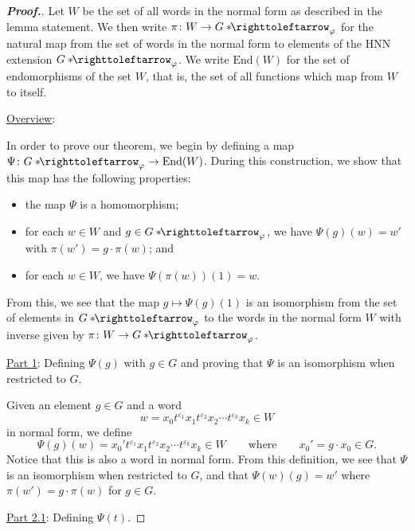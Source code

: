 \documentclass[11pt,a4paper,reqno]{amsart}
\theoremstyle{plain}
\theoremstyle{definition}
\theoremstyle{definition}
\newenvironment{myproof}{\begin{proof}[\normalfont\bfseries Proof.]}{\end{proof}}
\newcommand\hnn{*\!\!\righttoleftarrow}
\begin{document}
\begin{myproof}
	Let $W$ be the set of all words in the normal form as described in the lemma statement.
	We then write $\pi\colon W\to G\hnn_\varphi$ for the natural map from the set of words in the normal form to elements of the HNN extension $G\hnn_\varphi$.
	We write $\mathrm{End}(W)$ for the set of endomorphisms of the set $W$, that is, the set of all functions which map from $W$ to itself.

	\medskip
	\noindent
	\underline{Overview}:
	\nopagebreak

	\smallskip
	\noindent
	In order to prove our theorem, we begin by defining a map $\Psi\colon G\hnn_\varphi \to \mathrm{End}(W)$.
	During this construction, we show that this map has the following properties:
	\begin{itemize}
		\item the map $\Psi$ is a homomorphism;
		\item for each $w\in W$ and $g\in G\hnn_{\varphi}$, we have $\Psi(g)(w) = w'$ with $\pi(w') = g \cdot \pi(w)$; and
		\item for each $w\in W$, we have $\Psi(\pi(w))(1) = w$.
	\end{itemize}
	From this, we see that the map $g\mapsto \Psi(g)(1)$ is an isomorphism from the set of elements in $G\hnn_\varphi$ to the words in the normal form $W$ with inverse given by $\pi\colon W\to G\hnn_\varphi$.

	\medskip
	\noindent
	\underline{Part 1}: Defining $\Psi(g)$ with $g\in G$ and proving that $\Psi$ is an isomorphism when restricted to $G$.
	\nopagebreak

	\smallskip
	\noindent
	Given an element $g\in G$ and a word
	\[
		w = x_0 t^{\varepsilon_1} x_1 t^{\varepsilon_2} x_2 \cdots t^{\varepsilon_k} x_k \in W
	\]
	in normal form, we define
	\[
		\Psi(g)(w)
		=
		x_0' t^{\varepsilon_1} x_1 t^{\varepsilon_2} x_2 \cdots t^{\varepsilon_k} x_k \in W
		\qquad\text{where}
		\qquad x_0' = g \cdot x_0 \in G.
	\]
	Notice that this is also a word in normal form.
	From this definition, we see that $\Psi$ is an isomorphism when restricted to $G$, and that $\Psi(w)(g) = w'$ where $\pi(w')=g\cdot \pi(w)$ for $g\in G$.

	\medskip
	\noindent
	\underline{Part 2.1}: Defining $\Psi(t)$.
	\nopagebreak


\end{myproof}
\end{document}

